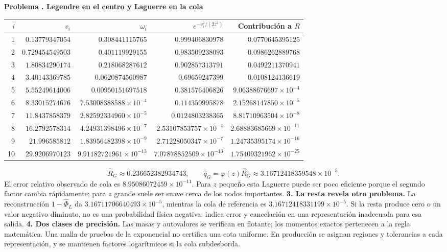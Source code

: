 \documentclass[11pt,a4paper]{article}
\theoremstyle{definition}
\newcounter{problema}
\newenvironment{resuelto}[1]{\refstepcounter{problema}\par\medskip\Needspace{6\baselineskip}\textbf{Problema \theproblema. #1}\par}{\par\medskip}
\begin{document}
\begin{resuelto}{Legendre en el centro y Laguerre en la cola}
\begin{center}\small\begin{tabular}{rrrrr}
\toprule
$i$&$v_i$&$\omega_i$&$e^{-v_i^2/(2z^2)}$&Contribución a $R$\\
\midrule
1&$0.13779347054$&$0.308441115765$&$0.999406830978$&$0.0770645395125$\\
2&$0.729454549503$&$0.401119929155$&$0.983509238093$&$0.0986262889768$\\
3&$1.80834290174$&$0.218068287612$&$0.902857313791$&$0.0492211370941$\\
4&$3.40143369785$&$0.0620874560987$&$0.69659247399$&$0.0108124136619$\\
5&$5.55249614006$&$0.00950151697518$&$0.381576406826$&$9.06388676697\times10^{-4}$\\
6&$8.33015274676$&$7.53008388588\times10^{-4}$&$0.114350995878$&$2.15268147850\times10^{-5}$\\
7&$11.8437858379$&$2.82592334960\times10^{-5}$&$0.0124803238365$&$8.81710963504\times10^{-8}$\\
8&$16.2792578314$&$4.24931398496\times10^{-7}$&$2.53107853757\times10^{-4}$&$2.68883685669\times10^{-11}$\\
9&$21.996585812$&$1.83956482398\times10^{-9}$&$2.71228050347\times10^{-7}$&$1.24735395174\times10^{-16}$\\
10&$29.9206970123$&$9.91182721961\times10^{-13}$&$7.07878852509\times10^{-13}$&$1.75409321962\times10^{-25}$\\
\bottomrule\end{tabular}\end{center}
\[
\widehat R_G\approx0.236652382934743,\qquad
\widehat q_G=\varphi(z)\widehat R_G\approx3.16712418359548\times10^{-5}.
\]
El error relativo observado de cola es $8.95086072459\times10^{-11}$. Para $z$ pequeño esta Laguerre puede ser poco eficiente porque el segundo factor cambia rápidamente; para $z$ grande suele ser suave cerca de los nodos importantes.
\textbf{3. La resta revela otro problema.} La reconstrucción $1-\widehat\Phi_L$ da $3.16711706640493\times10^{-5}$, mientras la cola de referencia es $3.16712418331199\times10^{-5}$. Si la resta produce cero o un valor negativo diminuto, no es una probabilidad física negativa: indica error y cancelación en una representación inadecuada para esa salida.
\textbf{4. Dos clases de precisión.} Las masas y autovalores se verifican en flotante; los momentos exactos pertenecen a la regla matemática. Una malla de pruebas de la exponencial no certifica una cota uniforme. En producción se asignan regiones y tolerancias a cada representación, y se mantienen factores logarítmicos si la cola subdesborda.
\end{resuelto}
\end{document}
